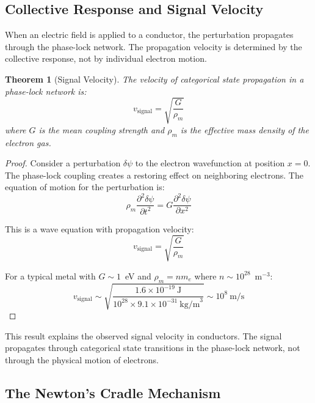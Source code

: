 \documentclass[twocolumn,showpacs,preprintnumbers,amsmath,amssymb,prd]{revtex4-2}
\newtheorem{theorem}{Theorem}[section]
\begin{document}
\subsection{Collective Response and Signal Velocity}

When an electric field is applied to a conductor, the perturbation propagates through the phase-lock network. The propagation velocity is determined by the collective response, not by individual electron motion.

\begin{theorem}[Signal Velocity]
\label{thm:signal_velocity}
The velocity of categorical state propagation in a phase-lock network is:
\begin{equation}
v_{\text{signal}} = \sqrt{\frac{G}{\rho_m}}
\label{eq:signal_velocity}
\end{equation}
where $G$ is the mean coupling strength and $\rho_m$ is the effective mass density of the electron gas.
\end{theorem}

\begin{proof}
Consider a perturbation $\delta\psi$ to the electron wavefunction at position $x = 0$. The phase-lock coupling creates a restoring effect on neighboring electrons. The equation of motion for the perturbation is:
\begin{equation}
\rho_m \frac{\partial^2 \delta\psi}{\partial t^2} = G \frac{\partial^2 \delta\psi}{\partial x^2}
\label{eq:wave_equation}
\end{equation}

This is a wave equation with propagation velocity:
\begin{equation}
v_{\text{signal}} = \sqrt{\frac{G}{\rho_m}}
\end{equation}

For a typical metal with $G \sim 1$~eV and $\rho_m = n m_e$ where $n \sim 10^{28}$~m$^{-3}$:
\begin{equation}
v_{\text{signal}} \sim \sqrt{\frac{1.6 \times 10^{-19}~\text{J}}{10^{28} \times 9.1 \times 10^{-31}~\text{kg/m}^3}} \sim 10^8~\text{m/s}
\end{equation}
\end{proof}

This result explains the observed signal velocity in conductors. The signal propagates through categorical state transitions in the phase-lock network, not through the physical motion of electrons.

\subsection{The Newton's Cradle Mechanism}
\end{document}
